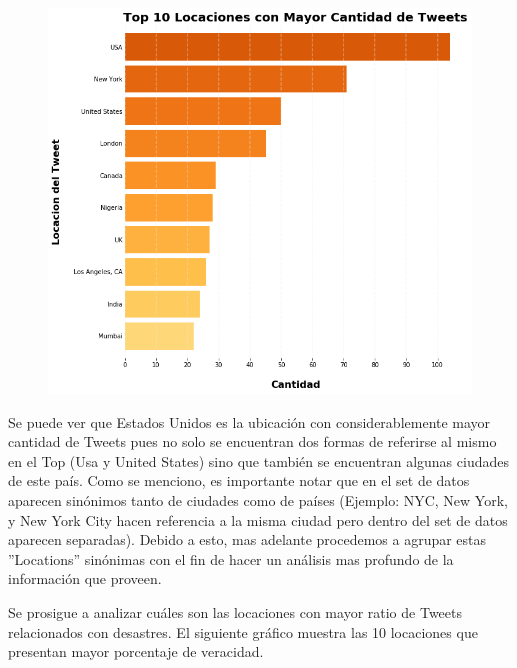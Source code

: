 \documentclass[titlepage,a4paper]{article}
\begin{document}
    \begin{figure}[H]
    \centering
    \includegraphics[width=1.1\textwidth]{graficos/Analisis de Locacion/top_10_locaciones_con_mayor_cantidad_de_tweets.png}
    \caption{} 
    \end{figure}
    
    Se puede ver que Estados Unidos es la ubicación con considerablemente mayor cantidad de Tweets pues no solo se encuentran dos formas de referirse al mismo en el Top (Usa y United States) sino que también se encuentran algunas ciudades de este país. Como se menciono, es importante notar que en el set de datos aparecen sinónimos tanto de ciudades como de países (Ejemplo: NYC, New York, y New York City hacen referencia a la misma ciudad pero dentro del set de datos aparecen separadas). Debido a esto, mas adelante procedemos a agrupar estas ''Locations'' sinónimas con el fin de hacer un análisis mas profundo de la información que proveen. 
    
    Se prosigue a analizar cuáles son las locaciones con mayor ratio de Tweets relacionados con desastres. El siguiente gráfico muestra las 10 locaciones que presentan mayor porcentaje de veracidad. 
    
\end{document}
